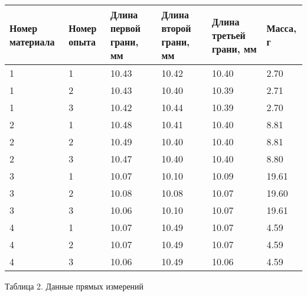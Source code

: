\documentclass[12pt]{article}
\begin{document}
\begin{enumerate}
 \begin{center}
    \begin{tabular}{|m{5em}|m{5em}|m{5em}|m{5em}|m{5em}|m{5em}|}
        \hline
        Номер материала & Номер опыта  & Длина первой грани, мм & Длина второй грани, мм &  Длина третьей грани, мм & Масса, г \\ 
        
        \hline
        1 & 1 & 10.43 & 10.42 & 10.40 & 2.70 \\ \hline
        1 & 2 & 10.43 & 10.40 & 10.39 & 2.71\\ \hline
        1 & 3 & 10.42 & 10.44 & 10.39 & 2.70 \\ \hline 
        2 & 1 & 10.48 & 10.41 & 10.40 & 8.81 \\ \hline
        2 & 2 & 10.49 & 10.40 & 10.40 & 8.81 \\ \hline
        2 & 3 & 10.47 & 10.40 & 10.40 & 8.80 \\ \hline
        3 & 1 & 10.07 & 10.10 & 10.09 & 19.61 \\ \hline
        3 & 2 & 10.08 & 10.08 & 10.07 & 19.60 \\ \hline
        3 & 3 & 10.06 & 10.10 & 10.07 & 19.61 \\ \hline
        4 & 1 & 10.07 & 10.49 & 10.07 & 4.59 \\ \hline
        4 & 2 & 10.07 & 10.49 & 10.07 & 4.59 \\ \hline
        4 & 3 & 10.06 & 10.49 & 10.06 & 4.59 \\ \hline
    \end{tabular}
     \end{center}

    \begin{center}
        Таблица 2. Данные прямых измерений 
      \end{center}
\begin{center}
    

\end{center}
\end{enumerate}
\end{document}
